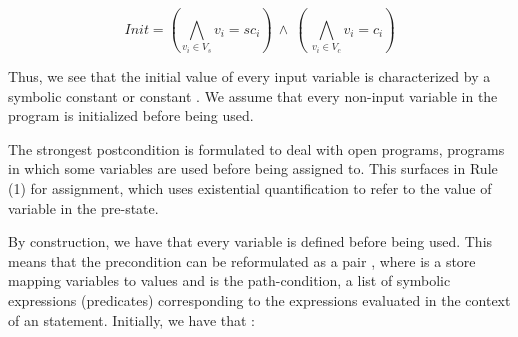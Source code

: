 \documentclass{IOS-Book-Article}
\begin{document}
\begin{mdDiv}[class={equation,align-center,para-block},label={[(1)]\{.equation-label\}},elem={equation},line-adjust={0},data-line={523}]%
{}%
{}
\begin{mdDiv}[class={math,para-block,input-math},elem={math},color={},math-needpdf={},line-adjust={0},data-line={524}]%
\begin{mdDiv}[class={math-display}]%
\[%
Init = (\bigwedge_{v_i \in V_s} v_i = sc_i) ~\wedge~ (~\bigwedge_{v_i \in V_c} v_i = c_i)\]%
\end{mdDiv}%
\end{mdDiv}%
\end{mdDiv}%
\begin{mdP}[data-line={527}]%
{}Thus, we see that the initial value of every input variable is characterized by 
a symbolic constant %
{}%
{} or constant %
{}%
{}.  We assume that every non-input
variable in the program is initialized before being used.%
\end{mdP}%
\begin{mdP}[class={indent},data-line={531}]%
{}The strongest postcondition is formulated to deal with open programs,
programs in which some variables are used before being assigned to. 
This surfaces in Rule (1) for assignment, which uses existential quantification
to refer to the value of variable %
{}%
{} in the pre-state.%
\end{mdP}%
\begin{mdP}[class={indent,para-continue},data-line={536}]%
{}By construction,
we have that every variable is defined before being used.  This means
that the precondition %
{}%
{} can be reformulated as a pair %
{}%
{},
where %
{}\mdSpan[class={math-inline},elem={math-inline}]{$\sigma$}%
{} is a store mapping variables to values and %
{}%
{} is
the path-condition, a list of symbolic expressions (predicates) 
corresponding
to the expressions %
{}%
{} evaluated in the context of an %
{}%
{} 
statement. Initially, we have that :%
\end{mdP}%
\end{document}
